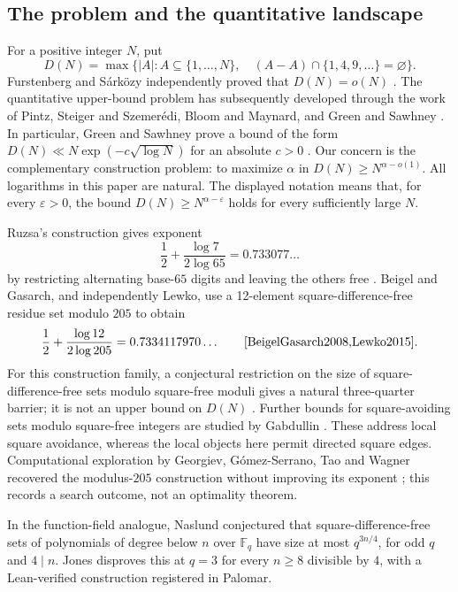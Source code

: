\documentclass[11pt]{article}
\theoremstyle{definition}
\theoremstyle{remark}
\newcommand{\card}[1]{\lvert #1\rvert}
\begin{document}
\subsection{The problem and the quantitative landscape}
For a positive integer $N$, put
\[
 D(N)=\max\bigl\{\card A:A\subseteq\{1,\ldots,N\},\quad
 (A-A)\cap\{1,4,9,\ldots\}=\varnothing\bigr\}.
\]
Furstenberg and S\'ark\"ozy independently proved that $D(N)=o(N)$
\cite{Furstenberg1977,Sarkozy1978}. The quantitative upper-bound problem has
subsequently developed through the work of Pintz, Steiger and Szemer\'edi,
Bloom and Maynard, and Green and Sawhney
\cite{PintzSteigerSzemeredi1988,BloomMaynard2022,GreenSawhney2025}.
In particular, Green and Sawhney prove a bound of the form
$D(N)\ll N\exp(-c\sqrt{\log N})$ for an absolute $c>0$
\cite[Theorem 1.1]{GreenSawhney2025}.
Our concern is the complementary construction problem: to maximize $\alpha$
in $D(N)\ge N^{\alpha-o(1)}$. All logarithms in this paper are natural.
The displayed notation means that, for every $\varepsilon>0$, the bound
$D(N)\ge N^{\alpha-\varepsilon}$ holds for every sufficiently large $N$.

Ruzsa's construction gives exponent
\[
 \frac12+\frac{\log7}{2\log65}=0.733077\ldots
\]
by restricting alternating base-$65$ digits and leaving the others free
\cite{Ruzsa1984}. Beigel and Gasarch, and independently Lewko, use a
12-element square-difference-free residue set modulo $205$ to obtain
\[
 \frac12+\frac{\log12}{2\log205}=0.7334117970\ldots
 \qquad\cite{BeigelGasarch2008,Lewko2015}.
\]
For this construction family, a conjectural restriction on the size of
square-difference-free sets modulo square-free moduli gives a natural
three-quarter barrier; it is not an upper bound on $D(N)$
\cite{Ruzsa1984,Lewko2015}.
Further bounds for square-avoiding sets modulo square-free integers are
studied by Gabdullin \cite{Gabdullin2018}. These address local square
avoidance, whereas the local objects here permit directed square edges.
Computational exploration by Georgiev, G\'omez-Serrano, Tao and Wagner
recovered the modulus-$205$ construction without improving its exponent
\cite[Section 16]{GeorgievEtAl2025}; this records a search outcome, not
an optimality theorem.

In the function-field analogue, Naslund \cite[Conjecture~13]{Naslund2022}
conjectured that square-difference-free sets of polynomials of degree below
$n$ over $\mathbb F_q$ have size at most $q^{3n/4}$, for odd $q$ and $4\mid n$.
Jones \cite{JonesPalomar2026} disproves this at $q=3$ for every $n\ge8$
divisible by $4$, with a Lean-verified construction registered in Palomar.
\end{document}
